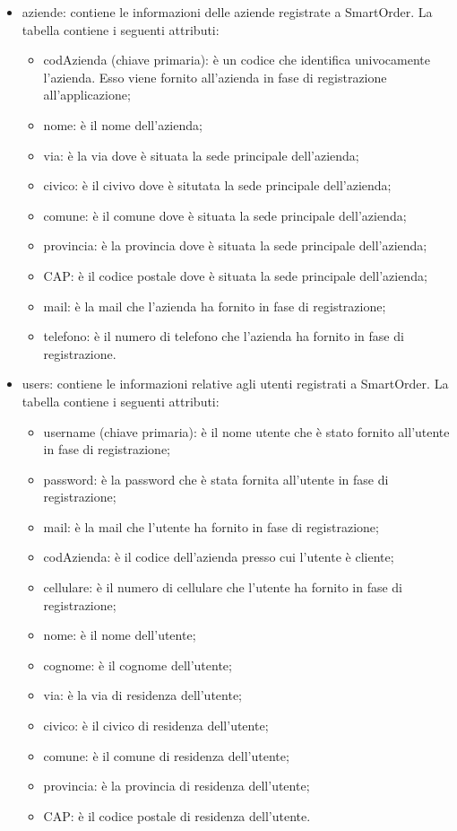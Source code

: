 \documentclass[12pt, a4paper, titlepage]{report}
\begin{document}
	\begin{itemize}
		\item aziende: contiene le informazioni delle aziende registrate a SmartOrder. La tabella contiene i seguenti attributi:
		\begin{itemize}
			\item codAzienda (chiave primaria): è un codice che identifica univocamente l'azienda. Esso viene fornito all'azienda in fase di registrazione all'applicazione;
			\item nome: è il nome dell'azienda;
			\item via: è la via dove è situata la sede principale dell'azienda;
			\item civico: è il civivo dove è situtata la sede principale dell'azienda;
			\item comune: è il comune dove è situata la sede principale dell'azienda;
			\item provincia: è la provincia dove è situata la sede principale dell'azienda;
			\item CAP: è il codice postale dove è situata la sede principale dell'azienda;
			\item mail: è la mail che l'azienda ha fornito in fase di registrazione;
			\item telefono: è il numero di telefono che l'azienda ha fornito in fase di registrazione.
		\end{itemize}
		\item users: contiene le informazioni relative agli utenti registrati a SmartOrder. La tabella contiene i seguenti attributi:
		\begin{itemize}
			\item username (chiave primaria): è il nome utente che è stato fornito all'utente in fase di registrazione;
			\item password: è la password che è stata fornita all'utente in fase di registrazione;
			\item mail: è la mail che l'utente ha fornito in fase di registrazione;
			\item codAzienda: è il codice dell'azienda presso cui l'utente è cliente;
			\item cellulare: è il numero di cellulare che l'utente ha fornito in fase di registrazione;
			\item nome: è il nome dell'utente;
			\item cognome: è il cognome dell'utente;
			\item via: è la via di residenza dell'utente;
			\item civico: è il civico di residenza dell'utente;
			\item comune: è il comune di residenza dell'utente;
			\item provincia: è la provincia di residenza dell'utente;
			\item CAP: è il codice postale di residenza dell'utente.
		\end{itemize}
	\end{itemize}
	
\end{document}
